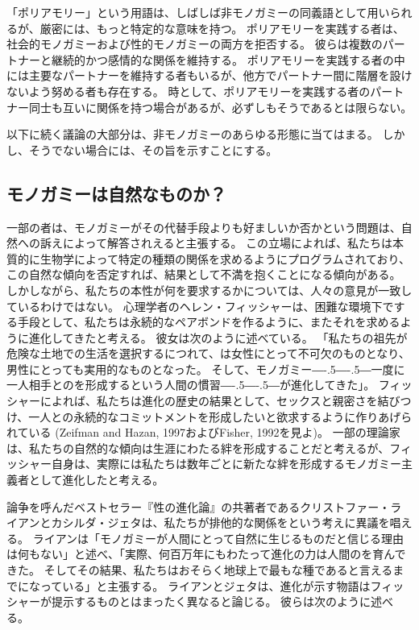 \documentclass[paper=a4,book,openany]{jlreq}
\def\DDASH{―\kern-.5\zw―\kern-.5\zw―} %
\begin{document}
「ポリアモリー」という用語は、しばしば非モノガミーの同義語として用いられるが、厳密には、もっと特定的な意味を持つ。
ポリアモリーを実践する者は、社会的モノガミーおよび性的モノガミーの両方を拒否する。
彼らは複数のパートナーと継続的かつ感情的な関係を維持する。
ポリアモリーを実践する者の中には主要なパートナーを維持する者もいるが、他方でパートナー間に階層を設けないよう努める者も存在する。
時として、ポリアモリーを実践する者のパートナー同士も互いに関係を持つ場合があるが、必ずしもそうであるとは限らない。

以下に続く議論の大部分は、非モノガミーのあらゆる形態に当てはまる。
しかし、そうでない場合には、その旨を示すことにする。

\subsection{モノガミーは自然なものか？}

一部の者は、モノガミーがその代替手段よりも好ましいか否かという問題は、自然への訴えによって解答されえると主張する。
この立場によれば、私たちは本質的に生物学によって特定の種類の関係を求めるようにプログラムされており、この自然な傾向を否定すれば、結果として不満を抱くことになる傾向がある。
しかしながら、私たちの本性が何を要求するかについては、人々の意見が一致しているわけではない。
心理学者のヘレン・フィッシャーは、困難な環境下でする手段として、私たちは永続的なペアボンドを作るように、またそれを求めるように進化してきたと考える。
彼女は次のように述べている。
「私たちの祖先が危険な土地での生活を選択するにつれて、は女性にとって不可欠のものとなり、男性にとっても実用的なものとなった。
そして、モノガミー{\DDASH}一度に一人相手とのを形成するという人間の慣習{\DDASH}が進化してきた」\citep[p.131]{fisher04:_why_we_love}。
フィッシャーによれば、私たちは進化の歴史の結果として、セックスと親密さを結びつけ、一人との永続的なコミットメントを形成したいと欲求するように作りあげられている
(Zeifman and Hazan, 1997およびFisher, 1992を見よ)。
\nocite{zeifman97:_proces_model_adult_attac_format}\nocite{fisher92:_anatom_love}
一部の理論家は、私たちの自然的な傾向は生涯にわたる絆を形成することだと考えるが、フィッシャー自身は、実際には私たちは数年ごとに新たな絆を形成するモノガミー主義者として進化したと考える。

論争を呼んだベストセラー『性の進化論』\citep{ryan10:_sex_dawn}の共著者であるクリストファー・ライアンとカシルダ・ジェタは、私たちが排他的な関係をという考えに異議を唱える。
ライアンは「モノガミーが人間にとって自然に生じるものだと信じる理由は何もない」と述べ、「実際、何百万年にもわたって進化の力は人間のを育んできた。
そしてその結果、私たちはおそらく地球上で最もな種であると言えるまでになっている」と主張する\citep{ryan10:_monog_unnat_our_sexy_species}。
ライアンとジェタは、進化が示す物語はフィッシャーが提示するものとはまったく異なると論じる。
彼らは次のように述べる。
\end{document}
